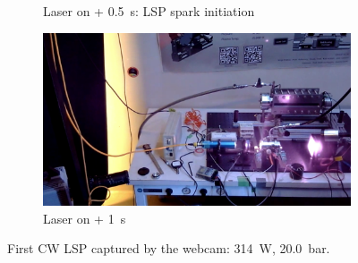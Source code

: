\begin{figure}[!ht]
\begin{subfigure}[t]{0.45\textwidth}
        \caption{Laser on + \qty{0.5}{s}: LSP spark initiation}
        \label{fig:CW_V2_webcam_frames_LSP}
    \end{subfigure}
    \hfill
    \begin{subfigure}[t]{0.45\textwidth}
        \centering
        \includegraphics[width=\textwidth]{assets/4 experiments/CW LSP frames webcam/After LSP.png}
        \caption{Laser on + \qty{1}{s}}
    \end{subfigure}
    \caption{First CW LSP captured by the webcam: \qty{314}{W}, \qty{20.0}{bar}.}
    \label{fig:CW_V2_webcam_frames}
\end{figure}